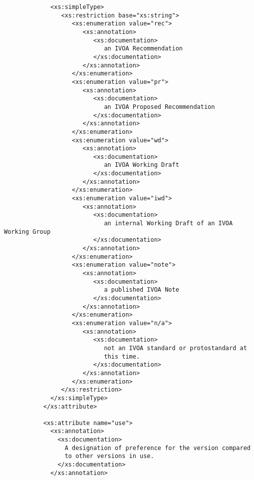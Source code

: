 \documentclass[11pt,a4paper]{ivoa}
\begin{document}
{{\begin{verbatim}
             <xs:simpleType>
                <xs:restriction base="xs:string">
                   <xs:enumeration value="rec">
                      <xs:annotation>
                         <xs:documentation>
                            an IVOA Recommendation
                         </xs:documentation>
                      </xs:annotation>
                   </xs:enumeration>
                   <xs:enumeration value="pr">
                      <xs:annotation>
                         <xs:documentation>
                            an IVOA Proposed Recommendation
                         </xs:documentation>
                      </xs:annotation>
                   </xs:enumeration>
                   <xs:enumeration value="wd">
                      <xs:annotation>
                         <xs:documentation>
                            an IVOA Working Draft
                         </xs:documentation>
                      </xs:annotation>
                   </xs:enumeration>
                   <xs:enumeration value="iwd">
                      <xs:annotation>
                         <xs:documentation>
                            an internal Working Draft of an IVOA Working Group
                         </xs:documentation>
                      </xs:annotation>
                   </xs:enumeration>
                   <xs:enumeration value="note">
                      <xs:annotation>
                         <xs:documentation>
                            a published IVOA Note
                         </xs:documentation>
                      </xs:annotation>
                   </xs:enumeration>
                   <xs:enumeration value="n/a">
                      <xs:annotation>
                         <xs:documentation>
                            not an IVOA standard or protostandard at
                            this time. 
                         </xs:documentation>
                      </xs:annotation>
                   </xs:enumeration>
                </xs:restriction>
             </xs:simpleType>
           </xs:attribute>

           <xs:attribute name="use">
             <xs:annotation>
               <xs:documentation>
                 A designation of preference for the version compared
                 to other versions in use.
               </xs:documentation>
             </xs:annotation>


\end{verbatim}}}
\end{document}
